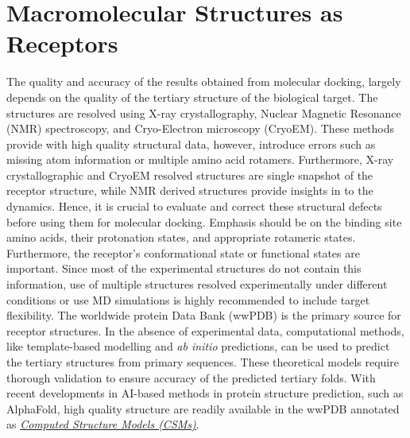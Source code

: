 \chapter*{Macromolecular Structures as Receptors}

The quality and accuracy of the results obtained from molecular docking, largely depends on the quality of the tertiary structure of the biological target. The structures are resolved using X-ray crystallography, Nuclear Magnetic Resonance (NMR) spectroscopy, and Cryo-Electron microscopy (CryoEM). These methods provide with high quality structural data, however, introduce errors such as missing atom information or multiple amino acid rotamers\cite{bib55, bib56}. Furthermore, X-ray crystallographic and CryoEM resolved structures are single snapshot of the receptor structure, while NMR derived structures provide insights in to the dynamics. Hence, it is crucial to evaluate and correct these structural defects before using them for molecular docking. Emphasis should be on the binding site amino acids, their protonation states, and appropriate rotameric states. Furthermore, the receptor's conformational state or functional states are important. Since most of the experimental structures do not contain this information, use of multiple structures resolved experimentally under different conditions or use MD simulations is highly recommended to include target flexibility. The worldwide protein Data Bank (wwPDB) is the primary source for receptor structures\cite{bib41}. In the absence of experimental data, computational methods, like template-based modelling and \textit{ab initio} predictions, can be used to predict the tertiary structures from primary sequences.  These theoretical models require thorough validation to ensure accuracy of the predicted tertiary folds. With recent developments in AI-based methods in protein structure prediction, such as AlphaFold\cite{bib37}, high quality structure are readily available in the wwPDB annotated as \href{https://pdb101.rcsb.org/learn/guide-to-understanding-pdb-data/computed-structure-models}{\textit{Computed Structure Models (CSMs)}}.

